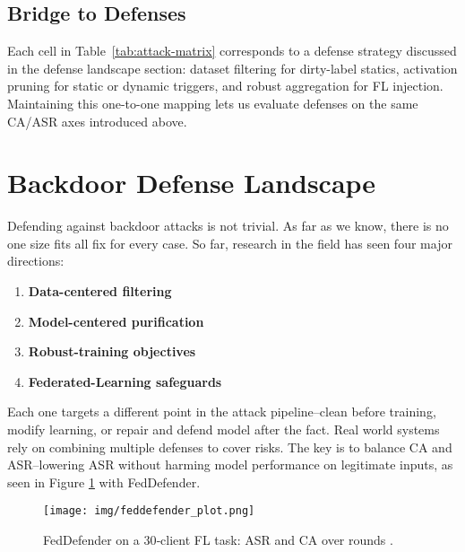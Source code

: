 \documentclass[sigconf,authorversion,nonacm,balance=false]{acmart}
\begin{document}
\subsection{Bridge to Defenses}
\label{sec:bridge}

Each cell in Table~\ref{tab:attack-matrix} corresponds to a defense strategy discussed in the defense landscape section:  
dataset filtering for dirty-label statics, activation pruning for static or dynamic triggers, and robust aggregation for FL injection.  
Maintaining this one-to-one mapping lets us evaluate defenses on the same CA/ASR axes introduced above.

\section{Backdoor Defense Landscape}
\label{sec:defense}

Defending against backdoor attacks is not trivial. As far as we know, there is no one size fits all fix for every case. So far, research in the field has seen four major directions:
\begin{enumerate}
    \item \textbf{Data-centered filtering}
    \item \textbf{Model-centered purification}
    \item \textbf{Robust-training objectives}
    \item \textbf{Federated-Learning safeguards}
\end{enumerate}
Each one targets a different point in the attack pipeline–clean before training, modify learning, or repair and defend model after the fact. Real world systems rely on combining multiple defenses to cover risks. The key is to balance CA and ASR–lowering ASR without harming model performance on legitimate inputs, as seen in Figure \ref{fig:feddefender} with FedDefender.

\begin{figure}[t]
  \centering
  \texttt{[image: img/feddefender\_plot.png]}
  \caption{FedDefender on a 30‑client FL task: ASR and CA over rounds \cite{casestudy_defense_gill_2023}.}
  \label{fig:feddefender}
\end{figure}
\end{document}
